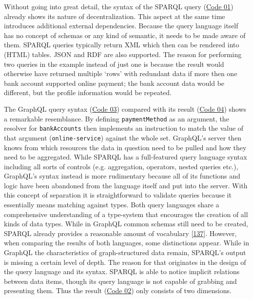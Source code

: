 \documentclass[12pt,english,a4paper,titlepage,cleardoublepage=empty,dottedtoc]{report}
\begin{document}
Without going into great detail, the syntax of the SPARQL query
(\protect\hyperlink{code-01_sparql-query}{Code 01}) already shows its
nature of decentralization. This aspect at the same time introduces
additional external dependencies. Because the query language itself has
no concept of schemas or any kind of semantic, it needs to be made aware
of them. SPARQL queries typically return XML which then can be rendered
into (HTML) tables. JSON and RDF are also supported. The reason for
performing two queries in the example instead of just one is because the
result would otherwise have returned multiple `rows' with redundant data
if more then one bank account supported online payment; the bank account
data would be different, but the profile information would be repeated.

The GraphQL query syntax (\protect\hyperlink{code-03_graphql-query}{Code
03}) compared with its result
(\protect\hyperlink{code-04_graphql-query-result}{Code 04}) shows a
remarkable resemblance. By defining \texttt{paymentMethod} as an
argument, the resolver for \texttt{bankAccounts} then implements an
instruction to match the value of that argument
(\texttt{\textquotesingle{}online-service\textquotesingle{}}) against
the whole set. GraphQL's server then knows from which resources the data
in question need to be pulled and how they need to be aggregated. While
SPARQL has a full-featured query language syntax including all sorts of
controls (e.g. aggregation, operators, nested queries etc.), GraphQL's
syntax instead is more rudimentary because all of its functions and
logic have been abandoned from the language itself and put into the
server. With this concept of separation it is straightforward to
validate queries because it essentially means matching against types.
Both query languages share a comprehensive understanding of a
type-system that encourages the creation of all kinds of data types.
While in GraphQL common schemas still need to be created, SPARQL already
provides a reasonable amount of vocabulary
{[}\protect\hyperlink{ref-web_w3c-tr_rdf-schemas}{137}{]}. However, when
comparing the results of both languages, some distinctions appear. While
in GraphQL the characteristics of graph-structured data remain, SPARQL's
output is missing a certain level of depth. The reason for that
originates in the design of the query language and its syntax. SPARQL is
able to notice implicit relations between data items, though its query
language is not capable of grabbing and presenting them. Thus the result
(\protect\hyperlink{code-02_sparql-query-results}{Code 02}) only
consists of two dimensions.
\end{document}
